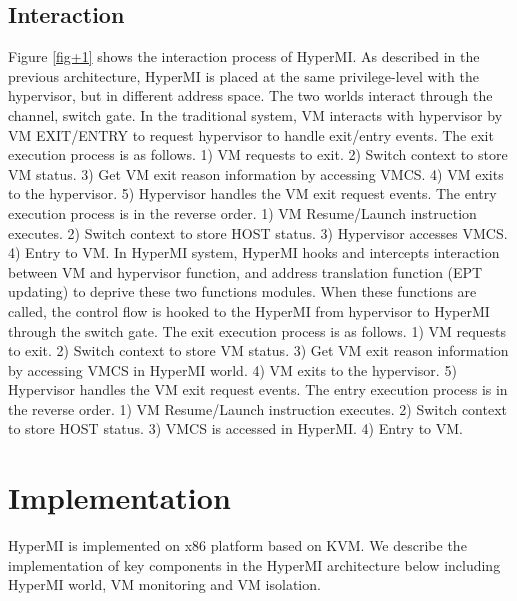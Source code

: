 \documentclass[conference]{IEEEtran}
\begin{document}
\subsection{Interaction} \label{IN}
Figure \ref{fig+1} shows the interaction process of HyperMI. 
As described in the previous architecture, HyperMI is placed at the same privilege-level with the hypervisor, but in different address space. The two worlds interact through the channel, switch gate.
In the traditional system, VM interacts with hypervisor by VM EXIT/ENTRY to request hypervisor to handle exit/entry events. The exit execution process is as follows. 1) VM requests to exit. 2) Switch context to store VM status. 3) Get VM exit reason information by accessing VMCS. 4) VM exits to the hypervisor. 5) Hypervisor handles the VM exit request events. 
The entry execution process is in the reverse order. 1) VM Resume/Launch instruction executes. 2) Switch context to store HOST status. 3) Hypervisor accesses VMCS. 4) Entry to VM.
In HyperMI system, HyperMI hooks and intercepts interaction between VM and hypervisor function, and address translation function (EPT updating) to deprive these two functions modules.
When these functions are called, the control flow is hooked to the HyperMI from hypervisor to HyperMI through the switch gate.
The exit execution process is as follows. 1) VM requests to exit. 2) Switch context to store VM status. 3) Get VM exit reason information by accessing VMCS in HyperMI world. 4) VM exits to the hypervisor. 5) Hypervisor handles the VM exit request events. 
The entry execution process is in the reverse order. 1) VM Resume/Launch instruction executes. 2) Switch context to store HOST status. 3) VMCS is accessed in HyperMI. 4) Entry to VM.
\section{Implementation}\label{sec:imp}
HyperMI is implemented on x86 platform based on KVM.
We describe the implementation of key components in the HyperMI architecture below including HyperMI world, VM monitoring and VM isolation.
\end{document}
